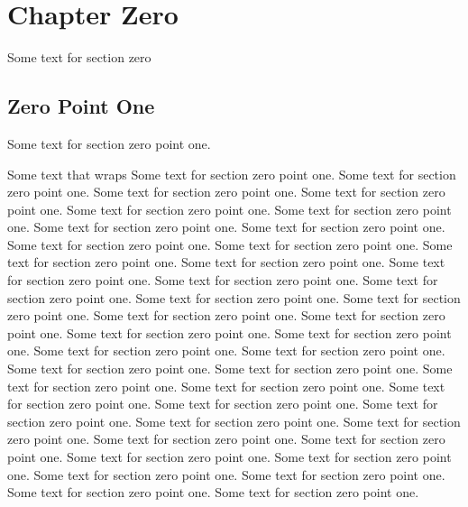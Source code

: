 \chapter{Chapter Zero}\label{chap:zero}

Some text for section zero

\section{Zero Point One}

Some text for section zero point one.

Some text that wraps
Some text for section zero point one. 
Some text for section zero point one.
Some text for section zero point one. 
Some text for section zero point one.
Some text for section zero point one. 
Some text for section zero point one.
Some text for section zero point one. 
Some text for section zero point one.
Some text for section zero point one. 
Some text for section zero point one.
Some text for section zero point one. 
Some text for section zero point one.
Some text for section zero point one. 
Some text for section zero point one.
Some text for section zero point one. 
Some text for section zero point one.
Some text for section zero point one. 
Some text for section zero point one.
Some text for section zero point one. 
Some text for section zero point one.
Some text for section zero point one. 
Some text for section zero point one.
Some text for section zero point one. 
Some text for section zero point one.
Some text for section zero point one. 
Some text for section zero point one.
Some text for section zero point one. 
Some text for section zero point one.
Some text for section zero point one. 
Some text for section zero point one.
Some text for section zero point one. 
Some text for section zero point one.
Some text for section zero point one. 
Some text for section zero point one.
Some text for section zero point one. 
Some text for section zero point one.
Some text for section zero point one. 
Some text for section zero point one.
Some text for section zero point one. 
Some text for section zero point one.


